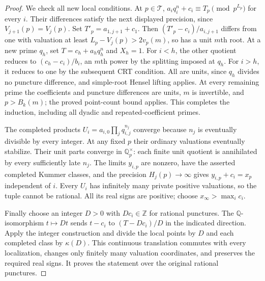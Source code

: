 \begin{proof}
We check all new local conditions. At $p\in\mathcal T$,
$a_iq_i^n+c_i\equiv T_p\pmod{p^{L_p}}$ for every $i$.
Their differences satisfy the next displayed precision, since
$V_{j+1}(p)=V_j(p)$. Set $T'_p=a_{1,j+1}+c_1$.
Then $(T'_p-c_i)/a_{i,j+1}$ differs from one with valuation at
least $L_p-V_j(p)>2v_p(m)$, so has a unit $m$th root.
At a new prime $q_h$, set $T=c_h+a_hq_h^n$ and $X_h=1$.
For $i<h$, the other quotient reduces to $(c_h-c_i)/b_i$,
an $m$th power by the splitting imposed at $q_h$.
For $i>h$, it reduces to one by the subsequent CRT condition.
All are units, since $q_h$ divides no puncture difference, and
simple-root Hensel lifting applies. At every remaining prime the
coefficients and puncture differences are units, $m$ is invertible,
and $p>B_k(m)$; the proved point-count bound applies. This completes
the induction, including all dyadic and repeated-coefficient primes.

The completed products $U_i=a_{i,0}\prod_jq_{i,j}^{n_j}$ converge
because $n_j$ is eventually divisible by every integer. At any fixed
$p$ their ordinary valuations eventually stabilize. Their unit parts
converge in $\mathbb Q_p^\times$: each finite unit quotient is
annihilated by every sufficiently late $n_j$. The limits $y_{i,p}$
are nonzero, have the asserted completed Kummer classes, and the
precision $H_j(p)\to\infty$ gives $y_{i,p}+c_i=x_p$ independent
of $i$. Every $U_i$ has infinitely many private positive valuations,
so the tuple cannot be rational. All its real signs are positive;
choose $x_\infty>\max_i c_i$.

Finally choose an integer $D>0$ with $Dc_i\in\mathbb Z$ for
rational punctures. The $\mathbb Q$-isomorphism $t\mapsto Dt$
sends $t-c_i$ to $(T-Dc_i)/D$ in the indicated direction.
Apply the integer construction and divide the local points by $D$
and each completed class by $\kappa(D)$. This continuous translation
commutes with every localization, changes only finitely many valuation
coordinates, and preserves the required real signs. It proves the
statement over the original rational punctures.
\end{proof}

